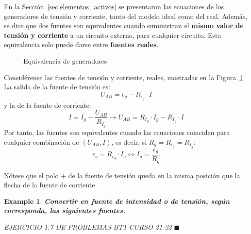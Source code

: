 \documentclass[11pt]{book} %
\numberwithin{dummy}{section}
\theoremstyle{ocrenumbox}
\theoremstyle{blacknumex}
\newtheorem{exampleT}{Example}[chapter]
\theoremstyle{blacknumbox}
\theoremstyle{ocrenum}
\newenvironment{example}{\begin{exampleT}}{\hfill{\tiny\ensuremath{\blacksquare}}\end{exampleT}}
\newenvironment{remark}{\par\vspace{10pt}\small %
\begin{list}{}{
\leftmargin=35pt %
\rightmargin=25pt}\item\ignorespaces %
\makebox[-2.5pt]{\begin{tikzpicture}[overlay]
\node[draw=ocre!60,line width=1pt,circle,fill=ocre!25,font=\sffamily\bfseries,inner sep=2pt,outer sep=0pt] at (-15pt,0pt){\textcolor{ocre}{N}};\end{tikzpicture}} %
\advance\baselineskip -1pt}{\end{list}\vskip5pt} %
\newlength\esp
\begin{document}
	En la Sección~\ref{sec.elementos_activos} se presentaron las ecuaciones de los generadores de tensión y corriente, tanto del modelo ideal como del real. Además, se dice que dos fuentes son equivalentes cuando suministran el \textbf{mismo valor de tensión y corriente} a un circuito externo, para cualquier circuito. Esta equivalencia solo puede darse entre \textbf{fuentes reales}.
	
	\begin{figure}[htbp]
		\centering
		\hfil
		\caption{Equivalencia de generadores}
		\label{fig.equivalencia_generadores}
	\end{figure}
	
	Considérense las fuentes de tensión y corriente, reales, mostradas en la Figura~\ref{fig.equivalencia_generadores}
	La salida de la fuente de tensión es:
	\begin{equation*}
		U_{AB} = \epsilon_g - R_{\epsilon_g} \cdot I
	\end{equation*}
	y la de la fuente de corriente:
	\begin{equation*}
		I = I_g - \frac{U_{AB}}{R_{I_g}} \rightarrow U_{AB} = R_{I_g} \cdot I_g - R_{I_g} \cdot I
	\end{equation*} 
	Por tanto, las fuentes son equivalentes cuando las ecuaciones coinciden para cualquier combinación de $(U_{AB}, I)$, es decir, si $R_g = R_{\epsilon_g} = R_{I_g}$:
	\begin{equation}\label{eq.equivalencia_fuentes}
		\boxed{\epsilon_g = R_{\epsilon_g} \cdot I_g \Leftrightarrow {I_g = \frac{\epsilon_g}{R_g}}}  
	\end{equation}
	
	\begin{remark}
	    Nótese que el polo $+$ de la fuente de tensión queda en la misma posición que la flecha de la fuente de corriente
	\end{remark}
	
	\begin{example}
	    \textbf{Convertir en fuente de intensidad o de tensión, según corresponda, las siguientes fuentes. }
	    
	    EJERCICIO 1.7 DE PROBLEMAS BT1 CURSO 21-22
	\end{example}
	
\end{document}
